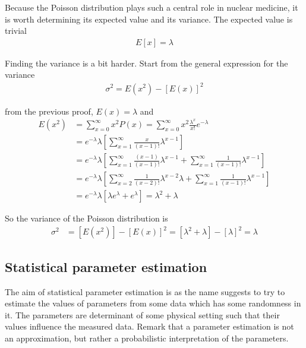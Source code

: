 \documentclass[report,12pt]{report}
\begin{document}
Because the Poisson distribution plays such a central role in nuclear medicine, it is worth determining its expected value and its variance. The expected value is trivial
\begin{align}
	E[x] = \lambda
\end{align}

Finding the variance is a bit harder. Start from the general expression for the variance
\begin{align}
	\sigma^2 = E(x^2) - [E(x)]^2
\end{align}

from the previous proof, $E(x) = \lambda$ and
\begin{align}
	E(x^2) &= \sum_{x = 0}^{\infty} x^2 P(x)
	= \sum_{x = 0}^{\infty} x^2 \frac{\lambda^x}{x!}e^{-\lambda}
	\nonumber\\
	&= e^{-\lambda} \lambda \left[ 
	\sum_{x = 1}^{\infty} \frac{x}{(x-1)!}\lambda^{x-1} \right]
	\nonumber\\\
	&= e^{-\lambda} \lambda \left[ 
	\sum_{x = 1}^{\infty} \frac{(x-1)}{(x-1)!}\lambda^{x-1} + 
	\sum_{x = 1}^{\infty} \frac{1}{(x-1)!}\lambda^{x-1}\right]
	\nonumber\\\
	&= e^{-\lambda} \lambda \left[ 
	\sum_{x = 2}^{\infty} \frac{1}{(x-2)!}\lambda^{x-2} \lambda + 
	\sum_{x = 1}^{\infty} \frac{1}{(x-1)!}\lambda^{x-1}\right]
	\nonumber\\\
	&= e^{-\lambda} \lambda \left[\lambda e^\lambda + e^\lambda \right]
	= \lambda^2 + \lambda
\end{align}


So the variance of the Poisson distribution is
\begin{align}
	\sigma^2 &= [E(x^2)] - [E(x)]^2
	= [\lambda^2 + \lambda] - [\lambda]^2
	= \lambda
\end{align}




\subsection{Statistical parameter estimation}
The aim of statistical parameter estimation is as the name suggests to try to estimate the values of parameters from some data which has some randomness in it. The parameters are determinant of some physical setting such that their values influence the measured data. Remark that a parameter estimation is not an approximation, but rather a probabilistic interpretation of the parameters.\\
\end{document}
